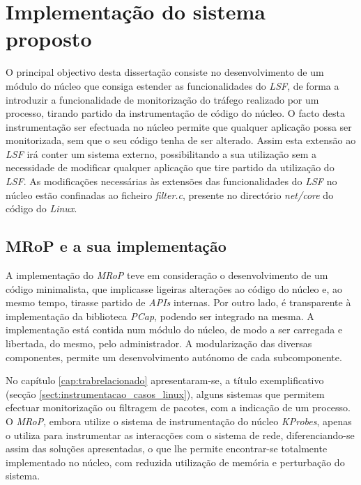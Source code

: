 \chapter{Implementação do sistema proposto}
\label{cap:Implementacao}




O principal objectivo desta dissertação consiste no desenvolvimento de um módulo do núcleo que consiga estender as funcionalidades do \textit{LSF}, de forma a introduzir a funcionalidade de monitorização do tráfego realizado por um processo, tirando partido da instrumentação de código do núcleo.
O facto desta instrumentação ser efectuada no núcleo permite que qualquer aplicação possa ser monitorizada, sem que o seu código tenha de ser alterado.
Assim esta extensão ao \textit{LSF} irá conter um sistema externo, possibilitando a sua utilização sem a necessidade de modificar qualquer aplicação que tire partido da utilização do \textit{LSF}.
As modificações necessárias às extensões das funcionalidades do \textit{LSF} no núcleo estão confinadas ao ficheiro \textit{filter.c}, presente no directório \textit{net/core} do código do \textit{Linux}.

\section{MRoP e a sua implementação}
\label{sec:mrop_implementation}

A implementação do \textit{MRoP} teve em consideração o desenvolvimento de um código minimalista, que implicasse ligeiras alterações ao código do núcleo e, ao mesmo tempo, tirasse partido de \textit{APIs} internas.
Por outro lado, é transparente à implementação da biblioteca \textit{PCap}, podendo ser integrado na mesma.
A implementação está contida num módulo do núcleo, de modo a ser carregada e libertada, do mesmo, pelo administrador.
A modularização das diversas componentes, permite um desenvolvimento autónomo de cada subcomponente.

No capítulo \ref{cap:trabrelacionado} apresentaram-se, a título exemplificativo (secção \ref{sect:instrumentacao_casos_linux}), alguns sistemas que permitem efectuar monitorização ou filtragem de pacotes, com a indicação de um processo.
O \textit{MRoP}, embora utilize o sistema de instrumentação do núcleo \textit{KProbes}, apenas o utiliza para instrumentar as interacções com o sistema de rede, diferenciando-se assim das soluções apresentadas, o que lhe permite encontrar-se totalmente implementado no núcleo, com reduzida utilização de memória e perturbação do sistema.

